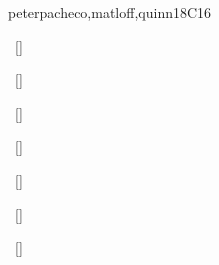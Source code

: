 \begin{syllabus}
\begin{unit}{\PDCommunicationandCoordination}{}{peterpacheco,matloff,quinn}{18}{C16}
\begin{topics}%
    \item \PDCommunicationandCoordinationTopicShared
    \item \PDCommunicationandCoordinationTopicConsistency
    \item \PDCommunicationandCoordinationTopicMessage
    \item \PDCommunicationandCoordinationTopicAtomicity
    \item \PDCommunicationandCoordinationTopicConsensus
    \item \PDCommunicationandCoordinationTopicConditional
\end{topics}
\begin{learningoutcomes}%
    \item \PDCommunicationandCoordinationLOUseMutual~[\Usage] %
    \item \PDCommunicationandCoordinationLOGiveAn~[\Familiarity] %
    \item \PDCommunicationandCoordinationLOGiveAnA~[\Usage] %
    \item \PDCommunicationandCoordinationLOExplainWhenMulticast~[\Familiarity] %
    \item \PDCommunicationandCoordinationLOWriteACorrectly~[\Usage] %
    \item \PDCommunicationandCoordinationLOGiveAnAWhich~[\Familiarity] %
    \item \PDCommunicationandCoordinationLOUseSemaphores~[\Usage] %
\end{learningoutcomes}%
\end{unit}


\end{syllabus}
